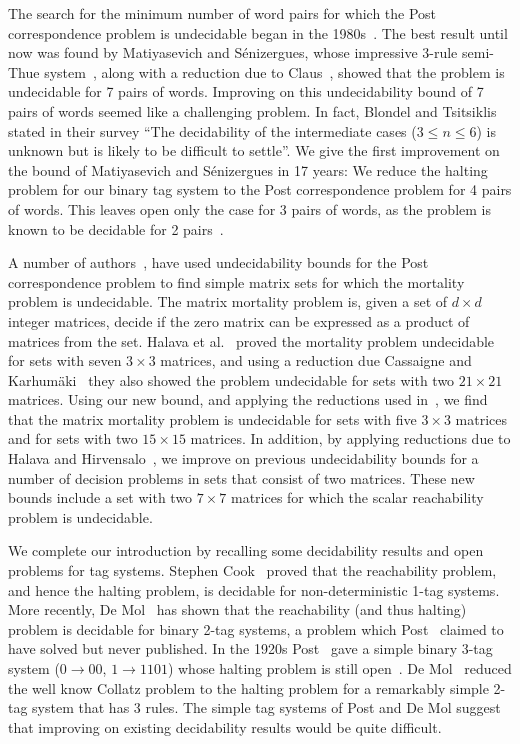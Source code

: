 \documentclass[11pt]{article} \usepackage{amsfonts,amsmath,amssymb,amsthm}
\begin{document}
 
The search for the minimum number of word pairs for which the Post correspondence problem is undecidable began in the 1980s~\cite{Claus1980,Pansiot1981}. 
The best result until now was found by Matiyasevich and S\'{e}nizergues, whose impressive 3-rule semi-Thue system~\cite{Matiyasevich1996,Matiyasevich2005}, along with a reduction due to Claus~\cite{Claus1980}, showed that the problem is undecidable for 7 pairs of words. 
Improving on this undecidability bound of 7 pairs of words seemed like a challenging problem. In fact, Blondel and Tsitsiklis~\cite{Blondel2000} stated in their survey ``The decidability of the intermediate cases ($3\leqslant n\leqslant 6$) is unknown but is likely to be difficult to settle''. We give the first improvement on the bound of Matiyasevich and S\'{e}nizergues in 17 years: We reduce the halting problem for our binary tag system to the Post correspondence problem for 4 pairs of words. This leaves open only the case for 3 pairs of words, as the problem is known to be decidable for 2 pairs~\cite{Ehrenfeucht1982,Halava2002A}. 


A number of authors~\cite{Blondel1997,Cassaigne1998,Halava2001,Halava2007,Paterson1970}, have used undecidability bounds for the Post correspondence problem to find simple matrix sets for which the mortality problem is undecidable. 
The matrix mortality problem is, given a set of $d\times d$ integer matrices, decide if the zero matrix can be expressed as a product of matrices from the set. Halava et al.~\cite{Halava2007} proved the mortality problem undecidable for sets with seven $3\times 3$ matrices, and using a reduction due Cassaigne and Karhum\"{a}ki~\cite{Cassaigne1998} they also showed the problem undecidable for sets with two $21\times 21$ matrices. 
Using our new bound, and applying the reductions used in~\cite{Cassaigne1998,Halava2001}, we find that the matrix mortality problem is undecidable for sets with five $3\times 3$ matrices and for sets with two $15\times 15$ matrices. In addition, by applying reductions due to Halava and Hirvensalo~\cite{Halava2007A}, we improve on previous undecidability bounds for a number of decision problems in sets that consist of two matrices. These new bounds include a set with two $7\times 7$ matrices for which the scalar reachability problem is undecidable.


We complete our introduction by recalling some decidability results and open problems for tag systems.  
Stephen Cook~\cite{Cook1966} proved that the reachability problem, and hence the halting problem, is decidable for non-deterministic
1-tag systems. More recently, De Mol~\cite{DeMol2010} has shown that the reachability (and thus halting) problem is decidable for binary 2-tag systems, a problem which Post~\cite{Post1965} claimed to have solved but never published. In the 1920s Post~\cite{Post1965} gave a simple binary 3-tag system ($0\rightarrow 00$, $1\rightarrow 1101$) whose halting problem is still open~\cite{DeMol2011}. De Mol~\cite{DeMol2008} reduced the well know Collatz problem to the halting problem for a remarkably simple 2-tag system that has 3 rules. The simple tag systems of Post and De Mol suggest that improving on existing decidability results would be quite difficult. 
\end{document}

